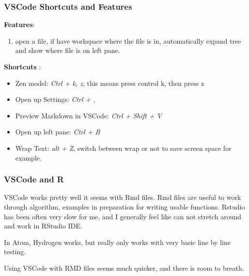 \documentclass[]{article}
\providecommand{\tightlist}{%
  \setlength{\itemsep}{0pt}\setlength{\parskip}{0pt}}
\begin{document}
\hypertarget{vscode-shortcuts-and-features}{%
\subsubsection{VSCode Shortcuts and
Features}\label{vscode-shortcuts-and-features}}

\textbf{Features}:

\begin{enumerate}
\def\labelenumi{\arabic{enumi}.}
\tightlist
\item
  open a file, if have workspace where the file is in, automatically
  expand tree and show where file is on left pane.
\end{enumerate}

\textbf{Shortcuts} :

\begin{itemize}
\tightlist
\item
  Zen model: \emph{Ctrl + k, z}, this means press control k, then press
  z
\item
  Open up Settings: \emph{Ctrl + ,}
\item
  Preview Markdown in VSCode: \emph{Ctrl + Shift + V}
\item
  Open up left pane: \emph{Ctrl + B}
\item
  Wrap Text: \emph{alt + Z}, switch between wrap or not to save screen
  space for example.
\end{itemize}

\hypertarget{vscode-and-r}{%
\subsubsection{VSCode and R}\label{vscode-and-r}}

VSCode works pretty well it seems with Rmd files. Rmd files are useful
to work through algorithm, examples in preparation for writing usable
functions. Rstudio has been often very slow for me, and I generally feel
like can not stretch around and work in RStudio IDE.

In Atom, Hydrogen works, but really only works with very basic line by
line testing.

Using VSCode with RMD files seems much quicker, and there is room to
breath.
\end{document}
